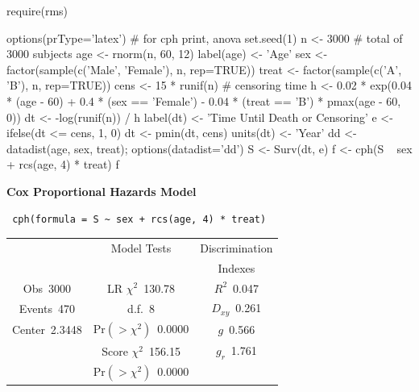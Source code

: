 \begin{Sinput}
require(rms)
\end{Sinput}
\begin{Sinput}
options(prType='latex')   # for cph print, anova
set.seed(1)
n <- 3000    # total of 3000 subjects
age <- rnorm(n, 60, 12)
label(age) <- 'Age'
sex   <- factor(sample(c('Male', 'Female'), n, rep=TRUE))
treat <- factor(sample(c('A', 'B'), n, rep=TRUE))
cens  <- 15 * runif(n)     # censoring time
h <- 0.02 * exp(0.04 * (age - 60) + 0.4 * (sex == 'Female') -  
                0.04 * (treat == 'B') * pmax(age - 60, 0))
dt <- -log(runif(n)) / h
label(dt) <- 'Time Until Death or Censoring'
e <- ifelse(dt <= cens, 1, 0)
dt <- pmin(dt, cens)
units(dt) <- 'Year'
dd <- datadist(age, sex, treat); options(datadist='dd')
S <- Surv(dt, e)
f <- cph(S ~ sex + rcs(age, 4) * treat)
f
\end{Sinput}

 \centerline{\textbf{Cox Proportional Hazards Model}}
 
 \begin{verbatim}
 cph(formula = S ~ sex + rcs(age, 4) * treat)
 \end{verbatim}
 
 {\selectfont \begin{center}\begin{tabular}{|c|c|c|}\hline
&Model Tests&Discrimination\\
&&Indexes\\\hline
Obs~\hfill 3000&LR $\chi^{2}$~\hfill 130.78&$R^{2}$~\hfill 0.047\\
Events~\hfill 470&d.f.~\hfill 8&$D_{xy}$~\hfill 0.261\\
Center~\hfill 2.3448&Pr$(>\chi^{2})$~\hfill 0.0000&$g$~\hfill 0.566\\
&Score $\chi^{2}$~\hfill 156.15&$g_{r}$~\hfill 1.761\\
&Pr$(>\chi^{2})$~\hfill 0.0000&\\
\hline
\end{tabular}
\end{center}}
 
